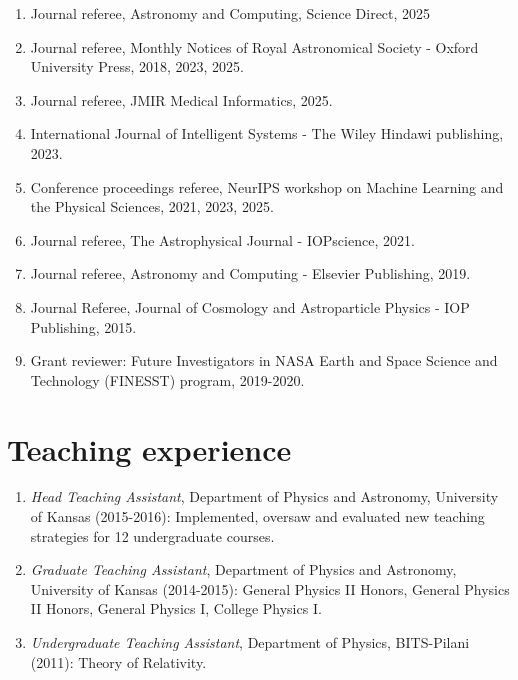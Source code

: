 \documentclass[letterpaper]{article}
\begin{document}
\begin{enumerate}


\item Journal referee, Astronomy and Computing, Science Direct, 2025

\item Journal referee, Monthly Notices of Royal Astronomical Society - Oxford University Press, 2018, 2023, 2025. 

\item Journal referee, JMIR Medical Informatics, 2025. 

\item International Journal of Intelligent Systems -  The Wiley Hindawi publishing, 2023.  

\item Conference proceedings referee, NeurIPS workshop on Machine Learning and the Physical Sciences, 2021, 2023, 2025. 

\item Journal referee, The Astrophysical Journal - IOPscience, 2021. %

\item Journal referee, Astronomy and Computing - Elsevier Publishing, 2019.

\item Journal Referee, Journal of Cosmology and Astroparticle Physics - IOP Publishing, 2015. 

\item Grant reviewer: Future Investigators in NASA Earth and Space Science and Technology (FINESST) program, 2019-2020.

\end{enumerate}



\section*{Teaching experience}
\begin{enumerate}

\item {\it Head Teaching Assistant}, Department of Physics and Astronomy, University of Kansas (2015-2016): Implemented, oversaw and evaluated new teaching strategies for 12 undergraduate courses.
\item {\it Graduate Teaching Assistant}, Department of Physics and Astronomy, University of Kansas (2014-2015): General Physics II Honors, General Physics II Honors, General Physics I, College Physics I.
\item {\it Undergraduate Teaching Assistant}, Department of Physics, BITS-Pilani (2011): Theory of Relativity.
 
 
\end{enumerate}
\end{document}
